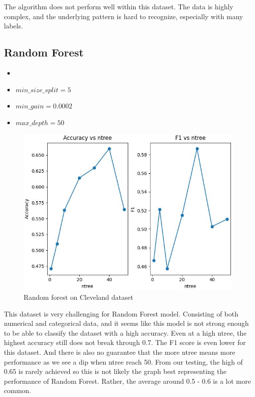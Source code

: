 \documentclass[letterpaper]{article}
\begin{document}
The algorithm does not perform well within this dataset. The data is highly complex, and the underlying pattern is hard to recognize, especially with many labels.
\subsection*{Random Forest}
\begin{itemize}
	\item {}
	\item $min\_size\_split = 5$
	\item $min\_gain = 0.0002$
	\item $max\_depth = 50$
\end{itemize}


\begin{figure}[H]
	\includegraphics[width=\textwidth]{figures/forest_cleveland.csv_ig.jpg}
	\caption{Random forest on Cleveland dataset}
	\label{fig:forest-cleveland}
\end{figure}
This dataset is very challenging for Random Forest model. Consisting of both numerical and categorical data, and it seems like this model is not strong
enough to be able to classify the dataset with a high accuracy. Even at a high ntree, the highest accuracy still does not break through 0.7. The F1 score
is even lower for this dataset. And there is also no guarantee that the more ntree means more performance as we see a dip when ntree reach 50. From our
testing, the high of 0.65 is rarely achieved so this is not likely the graph best representing the performance of Random Forest. Rather, the average around
0.5 - 0.6 is a lot more common.
\end{document}
